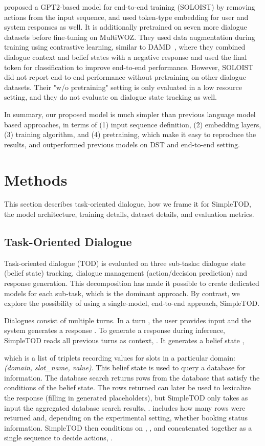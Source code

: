 \documentclass{article}
\begin{document}
\citet{peng2020soloist} proposed a GPT2-based model for end-to-end training (SOLOIST) by removing actions from the input sequence, and used token-type embedding for user and system responses as well. It is additionally pretrained on seven more dialogue datasets before fine-tuning on MultiWOZ. They used data augmentation during training using contrastive learning, similar to DAMD~\cite{DAMD2019zhang}, where they combined dialogue context and belief states with a negative response and used the final token for classification to improve end-to-end performance. However, SOLOIST did not report end-to-end performance without pretraining on other dialogue datasets. Their "w/o pretraining" setting is only evaluated in a low resource setting, and they do not evaluate on dialogue state tracking as well.

In summary, our proposed model is much simpler than previous language model based approaches, in terms of (1) input sequence definition, (2) embedding layers, (3) training algorithm, and (4) pretraining, which make it easy to reproduce the results, and outperformed previous models on DST and end-to-end setting. 
\section{Methods}
\label{sec:methods}




This section describes task-oriented dialogue, how we frame it for SimpleTOD, the model architecture, training details, dataset details, and evaluation metrics.

\subsection{Task-Oriented Dialogue} 
\label{ssec:model-task}
Task-oriented dialogue (TOD) is evaluated on three sub-tasks: 
dialogue state (belief state) tracking, 
dialogue management (action/decision prediction)
and response generation. 
This decomposition has made it possible to create dedicated models for each sub-task, 
which is the dominant approach.
By contrast, 
we explore the possibility of using a single-model, 
end-to-end approach, 
SimpleTOD.

Dialogues consist of multiple turns.
In a turn , the user provides input  and the system generates a response .
To generate a response during inference, 
SimpleTOD reads all previous turns as context, .
It generates a belief state ,

which is a list of triplets recording values for slots in a particular domain: \textit{(domain, slot\_name, value)}. 
This belief state is used to query a database for information. The database search returns rows from the database that satisfy the conditions of the belief state. 
The rows returned can later be used to lexicalize the response (filling in generated placeholders),
but SimpleTOD only takes as input the aggregated database search results, . 
 includes how many rows were returned and, depending on the experimental setting, whether booking status information.
SimpleTOD then conditions on , , and  concatenated together as a single sequence to decide actions, . 
\end{document}
